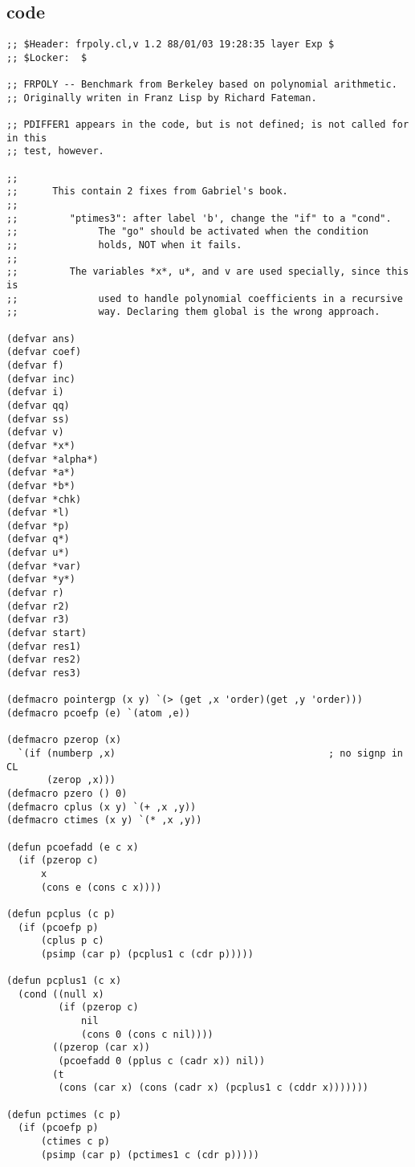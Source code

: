 \documentclass{amsart}
\begin{document}
\subsection{code}
\begin{verbatim}
;; $Header: frpoly.cl,v 1.2 88/01/03 19:28:35 layer Exp $
;; $Locker:  $

;; FRPOLY -- Benchmark from Berkeley based on polynomial arithmetic.
;; Originally writen in Franz Lisp by Richard Fateman.

;; PDIFFER1 appears in the code, but is not defined; is not called for in this
;; test, however.

;;
;;      This contain 2 fixes from Gabriel's book.
;;
;;         "ptimes3": after label 'b', change the "if" to a "cond".
;;              The "go" should be activated when the condition
;;              holds, NOT when it fails.
;;
;;         The variables *x*, u*, and v are used specially, since this is
;;              used to handle polynomial coefficients in a recursive
;;              way. Declaring them global is the wrong approach.

(defvar ans)
(defvar coef)
(defvar f)
(defvar inc)
(defvar i)
(defvar qq)
(defvar ss)
(defvar v)
(defvar *x*)
(defvar *alpha*)
(defvar *a*)
(defvar *b*)
(defvar *chk)
(defvar *l)
(defvar *p)
(defvar q*)
(defvar u*)
(defvar *var)
(defvar *y*)
(defvar r)
(defvar r2)
(defvar r3)
(defvar start)
(defvar res1)
(defvar res2)
(defvar res3)

(defmacro pointergp (x y) `(> (get ,x 'order)(get ,y 'order)))
(defmacro pcoefp (e) `(atom ,e))

(defmacro pzerop (x) 
  `(if (numberp ,x)                                     ; no signp in CL        
       (zerop ,x)))                   
(defmacro pzero () 0)
(defmacro cplus (x y) `(+ ,x ,y))
(defmacro ctimes (x y) `(* ,x ,y))

(defun pcoefadd (e c x) 
  (if (pzerop c)
      x
      (cons e (cons c x))))

(defun pcplus (c p)
  (if (pcoefp p)
      (cplus p c)
      (psimp (car p) (pcplus1 c (cdr p)))))

(defun pcplus1 (c x)
  (cond ((null x)
         (if (pzerop c)
             nil
             (cons 0 (cons c nil))))
        ((pzerop (car x))
         (pcoefadd 0 (pplus c (cadr x)) nil))
        (t
         (cons (car x) (cons (cadr x) (pcplus1 c (cddr x)))))))

(defun pctimes (c p) 
  (if (pcoefp p)
      (ctimes c p)
      (psimp (car p) (pctimes1 c (cdr p)))))


\end{verbatim}
\end{document}

